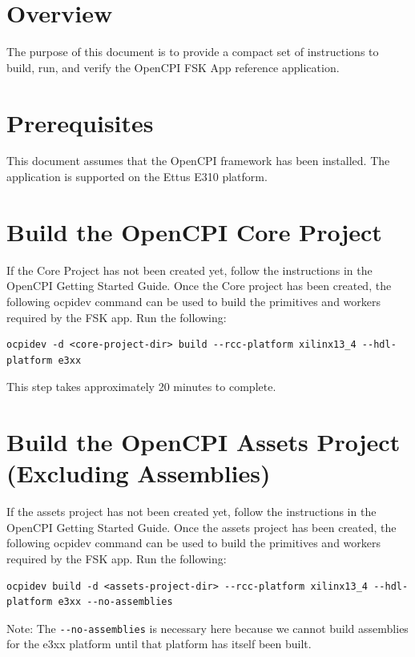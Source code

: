 \newpage
\begin{flushleft}
\section{Overview}
The purpose of this document is to provide a compact set of instructions to build, run, and verify the OpenCPI FSK App reference application.

\section{Prerequisites}
This document assumes that the OpenCPI framework has been installed. The application is supported on the Ettus E310 platform.

\section{Build the OpenCPI Core Project}
If the Core Project has not been created yet, follow the instructions in the OpenCPI Getting Started Guide. Once the Core project has been created, the following ocpidev command can be used to build the primitives and workers required by the FSK app. Run the following:
\begin{lstlisting}
ocpidev -d <core-project-dir> build --rcc-platform xilinx13_4 --hdl-platform e3xx
\end{lstlisting}

This step takes approximately 20 minutes to complete.\\

\section{Build the OpenCPI Assets Project (Excluding Assemblies)}
If the assets project has not been created yet, follow the instructions in the OpenCPI Getting Started Guide. Once the assets project has been created, the following ocpidev command can be used to build the primitives and workers required by the FSK app. Run the following:
\begin{lstlisting}
ocpidev build -d <assets-project-dir> --rcc-platform xilinx13_4 --hdl-platform e3xx --no-assemblies
\end{lstlisting}
Note: The \verb|--no-assemblies| is necessary here because we cannot build assemblies for the e3xx platform until that platform has itself been built.\\


\end{flushleft}
